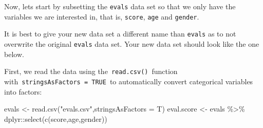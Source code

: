 \documentclass[
  letterpaper,
  DIV=11,
  numbers=noendperiod]{scrartcl}
\newenvironment{Shaded}{\begin{snugshade}}{\end{snugshade}}
\newcommand{\AttributeTok}[1]{\textcolor[rgb]{0.40,0.45,0.13}{#1}}
\newcommand{\FunctionTok}[1]{\textcolor[rgb]{0.28,0.35,0.67}{#1}}
\newcommand{\NormalTok}[1]{\textcolor[rgb]{0.00,0.23,0.31}{#1}}
\newcommand{\OtherTok}[1]{\textcolor[rgb]{0.00,0.23,0.31}{#1}}
\newcommand{\SpecialCharTok}[1]{\textcolor[rgb]{0.37,0.37,0.37}{#1}}
\newcommand{\StringTok}[1]{\textcolor[rgb]{0.13,0.47,0.30}{#1}}
\begin{document}
Now, lets start by subsetting the \texttt{evals} data set so that we
only have the variables we are interested in, that is, \texttt{score},
\texttt{age} and \texttt{gender}.

\begin{tcolorbox}[enhanced jigsaw, colback=white, toptitle=1mm, bottomrule=.15mm, colbacktitle=quarto-callout-note-color!10!white, breakable, title=\textcolor{quarto-callout-note-color}{\faInfo}\hspace{0.5em}{Note}, colframe=quarto-callout-note-color-frame, opacitybacktitle=0.6, toprule=.15mm, arc=.35mm, coltitle=black, leftrule=.75mm, bottomtitle=1mm, titlerule=0mm, opacityback=0, rightrule=.15mm, left=2mm]

It is best to give your new data set a different name than
\texttt{evals} as to not overwrite the original \texttt{evals} data set.
Your new data set should look like the one below.

\end{tcolorbox}

First, we read the data using the~\texttt{read.csv()}~function
with~\texttt{stringsAsFactors\ =\ TRUE}~to automatically convert
categorical variables into factors:

\begin{Shaded}
\begin{Highlighting}[]
\NormalTok{evals }\OtherTok{\textless{}{-}} \FunctionTok{read.csv}\NormalTok{(}\StringTok{"evals.csv"}\NormalTok{,}\AttributeTok{stringsAsFactors =}\NormalTok{ T)}
\NormalTok{eval.score }\OtherTok{\textless{}{-}}\NormalTok{ evals }\SpecialCharTok{\%\textgreater{}\%}
\NormalTok{  dplyr}\SpecialCharTok{::}\FunctionTok{select}\NormalTok{(}\FunctionTok{c}\NormalTok{(score,age,gender))}
\end{Highlighting}
\end{Shaded}
\end{document}
